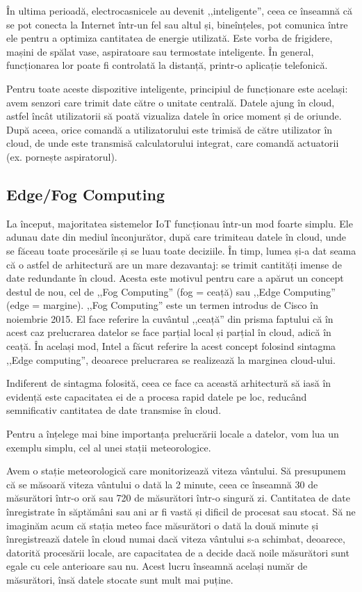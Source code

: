 În ultima perioadă, electrocasnicele au devenit ,,inteligente'', ceea ce înseamnă că se pot conecta la Internet într-un fel sau altul și, bineînțeles, pot comunica între ele pentru a optimiza cantitatea de energie utilizată.
Este vorba de frigidere, mașini de spălat vase, aspiratoare sau termostate inteligente.
În general, funcționarea lor poate fi controlată la distanță, printr-o aplicație telefonică.

Pentru toate aceste dispozitive inteligente, principiul de funcționare este același: avem senzori care trimit date către o unitate centrală.
Datele ajung în cloud, astfel încât utilizatorii să poată vizualiza datele în orice moment și de oriunde.
După aceea, orice comandă a utilizatorului este trimisă de către utilizator în cloud, de unde este transmisă calculatorului integrat, care comandă actuatorii (ex. pornește aspiratorul).

\subsection{Edge/Fog Computing}
\label{sec:embed-iot-edge}

La început, majoritatea sistemelor IoT funcționau într-un mod foarte simplu.
Ele adunau date din mediul înconjurător, după care trimiteau datele în cloud, unde se făceau toate procesările și se luau toate deciziile.
În timp, lumea și-a dat seama că o astfel de arhitectură are un mare dezavantaj: se trimit cantități imense de date redundante în cloud.
Acesta este motivul pentru care a apărut un concept destul de nou, cel de ,,Fog Computing'' (fog = ceață) sau ,,Edge Computing'' (edge = margine).
,,Fog Computing'' este un termen introdus de Cisco în noiembrie 2015.
El face referire la cuvântul ,,ceață'' din prisma faptului că în acest caz prelucrarea datelor se face parțial local și parțial în cloud, adică în ceață.
În același mod, Intel a făcut referire la acest concept folosind sintagma ,,Edge computing'', deoarece prelucrarea se realizează la marginea cloud-ului.

Indiferent de sintagma folosită, ceea ce face ca această arhitectură să iasă în evidență este capacitatea ei de a procesa rapid datele pe loc, reducând semnificativ cantitatea de date transmise în cloud.

Pentru a înțelege mai bine importanța prelucrării locale a datelor, vom lua un exemplu simplu, cel al unei stații meteorologice.

Avem o stație meteorologică care monitorizează viteza vântului.
Să presupunem că se măsoară viteza vântului o dată la 2 minute, ceea ce înseamnă 30 de măsurători într-o oră sau 720 de măsurători într-o singură zi.
Cantitatea de date înregistrate în săptămâni sau ani ar fi vastă și dificil de procesat sau stocat.
 Să ne imaginăm acum că stația meteo face măsurători o dată la două minute și înregistrează datele în cloud numai dacă viteza vântului s-a schimbat, deoarece, datorită procesării locale, are capacitatea de a decide dacă noile măsurători sunt egale cu cele anterioare sau nu.
Acest lucru înseamnă același număr de măsurători, însă datele stocate sunt mult mai puține.


